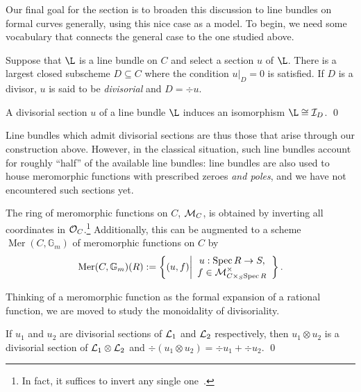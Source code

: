 Our final goal for the section is to broaden this discussion to line bundles on formal curves generally, using this nice case as a model.  To begin, we need some vocabulary that connects the general case to the one studied above.

\begin{definition}
Suppose that $\L$ is a line bundle on $C$ and select a section $u$ of $\L$.  There is a largest closed subscheme $D \subseteq C$ where the condition $u|_D = 0$ is satisfied.  If $D$ is a divisor, $u$ is said to be \textit{divisorial} and $D = \div u$.
\end{definition}

\begin{lemma}
A divisorial section $u$ of a line bundle $\L$ induces an isomorphism $\L \cong \sheaf I_D$. \qed
\end{lemma}

Line bundles which admit divisorial sections are thus those that arise through our construction above.  However, in the classical situation, such line bundles account for roughly ``half'' of the available line bundles: line bundles are also used to house meromorphic functions with prescribed zeroes \emph{and poles}, and we have not encountered such sections yet.

\begin{definition}
The ring of meromorphic functions on $C$, $\mathcal{M}_C$, is obtained by inverting all coordinates in $\mathcal{O}_C$.\footnote{In fact, it suffices to invert any single one~\cite[Lemma 5.21]{StricklandFSFG}.}  Additionally, this can be augmented to a scheme $\operatorname{Mer}(C, \mathbb G_m)$ of meromorphic functions on $C$ by \[\operatorname{Mer}(C, \mathbb G_m)(R) := \left\{ (u, f) \middle| \begin{array}{c} u: \operatorname{Spec} R \to S, \\ f \in \mathcal{M}^\times_{C \times_S \operatorname{Spec} R} \end{array} \right\}.\]
\end{definition}

Thinking of a meromorphic function as the formal expansion of a rational function, we are moved to study the monoidality of divisoriality.

\begin{lemma}
If $u_1$ and $u_2$ are divisorial sections of $\mathcal{L}_1$ and $\mathcal{L}_2$ respectively, then $u_1 \otimes u_2$ is a divisorial section of $\mathcal{L}_1 \otimes \mathcal{L}_2$ and $\div(u_1 \otimes u_2) = \div u_1 + \div u_2$. \qed
\end{lemma}

